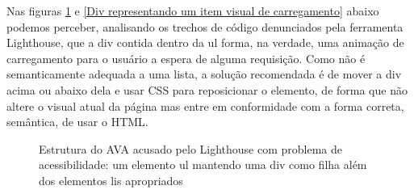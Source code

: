\documentclass[
	12pt,				%
	openright,			%
	oneside,			%
	a4paper,			%
	chapter=TITLE,		%
	section=TITLE,		%
	subsection=TITLE,	%
	subsubsection=TITLE,%
	english,			%
	brazil				%
	]{abntex2}
\theoremstyle{definition}
\begin{document}
\begin{itemize}
Nas figuras \ref{Estrutura do AVA acusado pelo Lighthouse com problema de acessibilidade: um  elemento ul mantendo uma div como filha além dos elementos lis apropriados} e \ref{Div representando um item visual de carregamento} abaixo podemos perceber, analisando os trechos de código denunciados pela ferramenta Lighthouse, que a div contida dentro da ul forma, na verdade, uma animação de carregamento para o usuário a espera de alguma requisição. Como não é semanticamente adequada a uma lista, a solução recomendada é de mover a div acima ou abaixo dela e usar CSS para reposicionar o elemento, de forma que não altere o visual atual da página mas entre em conformidade com a forma correta, semântica, de usar o HTML.

\begin{figure}[!h]
\centering
\caption{Estrutura do AVA acusado pelo Lighthouse com problema de acessibilidade: um  elemento ul mantendo uma div como filha além dos elementos lis apropriados}
\label{Estrutura do AVA acusado pelo Lighthouse com problema de acessibilidade: um  elemento ul mantendo uma div como filha além dos elementos lis apropriados}
\end{figure}


\end{itemize}
\end{document}
